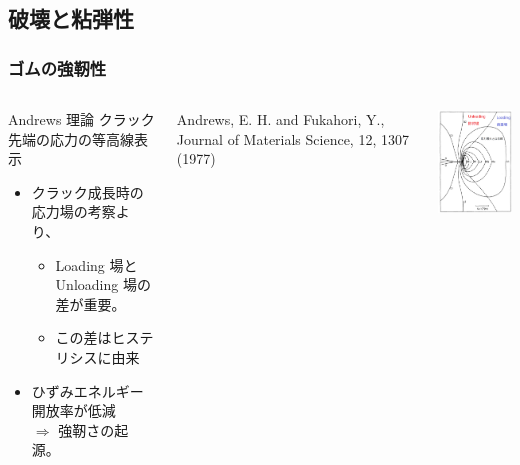 \documentclass[11pt, dvipdfmx]{beamer}
\begin{document}
\subsection{破壊と粘弾性}
\begin{frame}
\frametitle{ゴムの強靭性}


\begin{columns}[totalwidth=1\textwidth]
\begin{exampleblock}{Andrews 理論}
クラック先端の応力の等高線表示
	\begin{itemize}
	\item
	クラック成長時の応力場の考察より、
		\begin{itemize}
		\item
		{\color{red} Loading 場とUnloading 場の差}が重要。
		\item
		この差は\alert{ヒステリシスに由来}
		\end{itemize}	
	\item
	\alert{ひずみエネルギー開放率が低減} \\$\Rightarrow$ 強靭さの起源。
	\end{itemize}
\end{exampleblock}

{Andrews, E. H. and Fukahori, Y., Journal of Materials Science, 12, 1307 (1977)}

\centering
\includegraphics[width=40mm]{./fig/crack.png}
\end{columns}
\end{frame}
\end{document}
